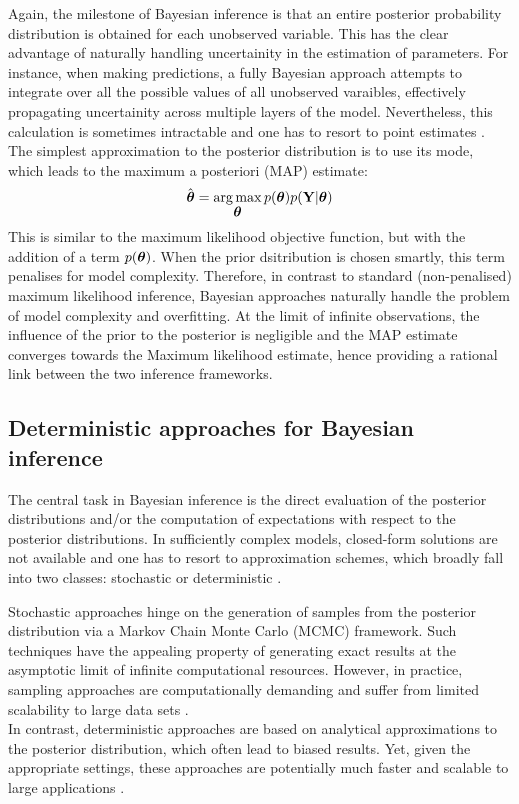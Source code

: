 Again, the milestone of Bayesian inference is that an entire posterior probability distribution is obtained for each unobserved variable. This has the clear advantage of naturally handling uncertainity in the estimation of parameters. For instance, when making predictions, a fully Bayesian approach attempts to integrate over all the possible values of all unobserved varaibles, effectively propagating uncertainity across multiple layers of the model. Nevertheless, this calculation is sometimes intractable and one has to resort to point estimates \cite{Bishop,Murphy,Gelman2013}. The simplest approximation to the posterior distribution is to use its mode, which leads to the maximum a posteriori (MAP) estimate:
\[
	\hat{\mbox{\boldmath $\theta$}} = \operatorname*{arg\,max}_{\mbox{\boldmath $\theta$}} p(\mbox{\boldmath $\theta$}) p({\bf Y}|\mbox{\boldmath $\theta$}) 
\]
This is similar to the maximum likelihood objective function, but with the addition of a term $p(\mbox{\boldmath $\theta$})$. When the prior dsitribution is chosen smartly, this term penalises for model complexity. Therefore, in contrast to standard (non-penalised) maximum likelihood inference, Bayesian approaches naturally handle the problem of model complexity and overfitting\cite{Bishop,Murphy,Gelman2013}. At the limit of infinite observations, the influence of the prior to the posterior is negligible and the MAP estimate converges towards the Maximum likelihood estimate, hence providing a rational link between the two inference frameworks.

\subsection{Deterministic approaches for Bayesian inference} \label{section:deterministic_bayesian_inference}
The central task in Bayesian inference is the direct evaluation of the posterior distributions and/or the computation of expectations with respect to the posterior distributions. In sufficiently complex models, closed-form solutions are not available and one has to resort to approximation schemes, which broadly fall into two classes: stochastic or deterministic \cite{Gelman2013,Blei2016}. 

Stochastic approaches hinge on the generation of samples from the posterior distribution via a Markov Chain Monte Carlo (MCMC) framework. Such techniques have the appealing property of generating exact results at the asymptotic limit of infinite computational resources. However, in practice, sampling approaches are computationally demanding and suffer from limited scalability to large data sets \cite{Blei2016}. \\
In contrast, deterministic approaches are based on analytical approximations to the posterior distribution, which often lead to biased results. Yet, given the appropriate settings, these approaches are potentially much faster and scalable to large applications \cite{Bishop,Murphy,Blei2016}.

